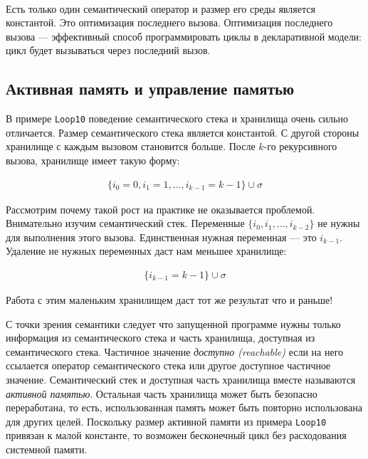 \begin{eqnarray*}
  [(\text{\lstinline|$\{$Loop10 I+1$\}$|}, \{I \to i_{k-1}\})]
\end{eqnarray*}


Есть только один семантический оператор и размер его среды является константой. Это оптимизация последнего вызова. Оптимизация последнего вызова --- эффективный способ программировать циклы в декларативной модели: цикл будет вызываться через последний вызов.

\subsection{Активная память и управление памятью}

В примере \lstinline|Loop10| поведение семантического стека и хранилища очень сильно отличается. Размер семантического стека является константой. С другой стороны хранилище с каждым вызовом становится больше. После $k$-го рекурсивного вызова, хранилище имеет такую форму:

\begin{eqnarray*}
  \{i_0 = 0, i_1 = 1, ..., i_{k-1} = k - 1\} \cup \sigma
\end{eqnarray*}

Рассмотрим почему такой рост на практике не оказывается проблемой. Внимательно изучим семантический стек. Переменные $\{i_0, i_1, ..., i_{k-2}\}$  не нужны для выполнения этого вызова. Единственная нужная переменная --- это $i_{k-1}$. Удаление не нужных переменных даст нам меньшее хранилище:

\begin{eqnarray*}
  \{i_{k-1} = k - 1\} \cup \sigma
\end{eqnarray*}


Работа с этим маленьким хранилищем даст тот же результат что и раньше!

С точки зрения семантики следует что запущенной программе нужны только информация из семантического стека и часть хранилища, доступная из семантического стека. Частичное значение \emph{доступно (reachable)} если на него ссылается оператор семантического стека или другое доступное частичное значение. Семантический стек и доступная часть хранилища вместе называются \emph{активной памятью}. Остальная часть хранилища может быть безопасно переработана, то есть, использованная память может быть повторно использована для других целей. Поскольку размер активной памяти из примера \lstinline|Loop10| привязан к малой константе, то возможен бесконечный цикл без расходования системной памяти.


